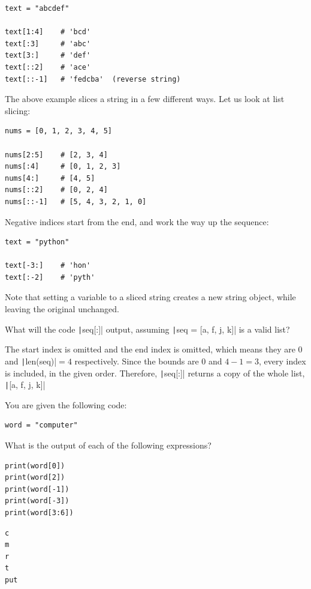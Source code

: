\begin{verbatim}
text = "abcdef"

text[1:4]    # 'bcd'
text[:3]     # 'abc'
text[3:]     # 'def'
text[::2]    # 'ace'
text[::-1]   # 'fedcba'  (reverse string)
\end{verbatim}
The above example slices a string in a few different ways. Let us look at list slicing:


\begin{verbatim}
nums = [0, 1, 2, 3, 4, 5]

nums[2:5]    # [2, 3, 4]
nums[:4]     # [0, 1, 2, 3]
nums[4:]     # [4, 5]
nums[::2]    # [0, 2, 4]
nums[::-1]   # [5, 4, 3, 2, 1, 0]
\end{verbatim}

Negative indices start from the end, and work the way up the sequence:
\begin{verbatim}
text = "python"

text[-3:]    # 'hon'
text[:-2]    # 'pyth'
\end{verbatim}

Note that setting a variable to a sliced string creates a new string object, while leaving the original unchanged.
\begin{Exercise}[label=slicing1,title=Mystery Sequence]
    What will the code \texttt|seq[:]| output, assuming \texttt|seq = [a, f, j, k]| is a valid list?
\end{Exercise}
\begin{Answer}[ref=slicing1]
    The start index is omitted and the end index is omitted, which means they are 0 and \texttt|len(seq)|$=4$ respectively. Since the bounds are $0$ and $4-1=3$, every index is included, in the given order. Therefore, \texttt|seq[:]| returns a copy of the whole list, \texttt|[a, f, j, k]|
\end{Answer}

\begin{Exercise}[label=indexing1, title=Computer... Indexing!]
You are given the following code:
\begin{verbatim}
word = "computer"
\end{verbatim}
What is the output of each of the following expressions?
\begin{verbatim}
print(word[0])
print(word[2])    
print(word[-1])   
print(word[-3])
print(word[3:6])  
\end{verbatim}
\end{Exercise}
\begin{Answer}[ref=indexing1]
\begin{verbatim}
c
m
r
t
put
\end{verbatim}
\end{Answer}

